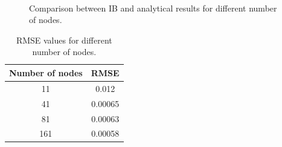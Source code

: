 \begin{figure}[H]
    \centering
    \quad
    \\
    \quad
    \caption{Comparison between IB and analytical results for different number of nodes.}
    \label{fig:C3_virtualBoundaryResultNodeNumber}
\end{figure}

\begin{table}[H]
\centering
\begin{tabular}{c | c }
     Number of nodes & RMSE \\ \hline \hline
     11 & 0.012 \\ \hline
     41 & 0.00065 \\ \hline
     81 & 0.00063 \\ \hline
     161 & 0.00058 \\
\end{tabular}
\caption{RMSE values for different number of nodes.}
\label{table:C3_virtualBoundaryResultNodeNumberRMSE}
\end{table}

